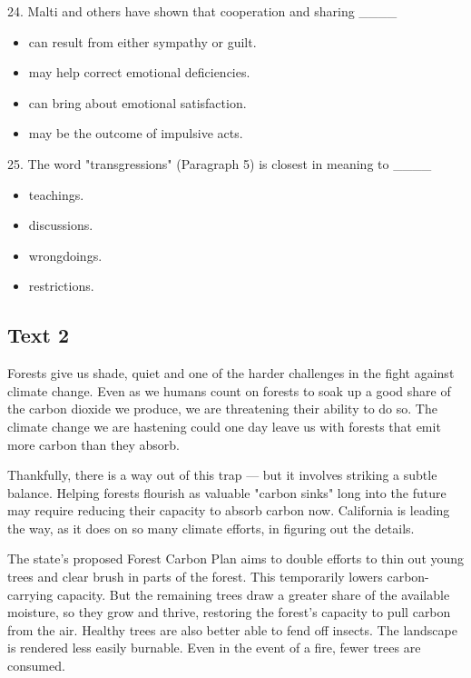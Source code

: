 \documentclass[UTF8,11pt]{ctexart}
\begin{document}
24. Malti and others have shown that cooperation and sharing \_\_\_\_


\begin{itemize}[leftmargin=2em,itemsep=.2em,topsep=.4em]\item[A.] can result from either sympathy or guilt.
\item[B.] may help correct emotional deficiencies.
\item[C.] can bring about emotional satisfaction.
\item[D.] may be the outcome of impulsive acts.
\end{itemize}

25. The word "transgressions" (Paragraph 5) is closest in meaning to \_\_\_\_


\begin{itemize}[leftmargin=2em,itemsep=.2em,topsep=.4em]\item[A.] teachings.
\item[B.] discussions.
\item[C.] wrongdoings.
\item[D.] restrictions.
\end{itemize}

\subsection*{\textbf{Text 2}}


Forests give us shade, quiet and one of the harder challenges in the fight against climate change. Even as we humans count on forests to soak up a good share of the carbon dioxide we produce, we are threatening their ability to do so. The climate change we are hastening could one day leave us with forests that emit more carbon than they absorb.


Thankfully, there is a way out of this trap — but it involves striking a subtle balance. Helping forests flourish as valuable "carbon sinks" long into the future may require reducing their capacity to absorb carbon now. California is leading the way, as it does on so many climate efforts, in figuring out the details.


The state's proposed Forest Carbon Plan aims to double efforts to thin out young trees and clear brush in parts of the forest. This temporarily lowers carbon-carrying capacity. But the remaining trees draw a greater share of the available moisture, so they grow and thrive, restoring the forest's capacity to pull carbon from the air. Healthy trees are also better able to fend off insects. The landscape is rendered less easily burnable. Even in the event of a fire, fewer trees are consumed.
\end{document}

